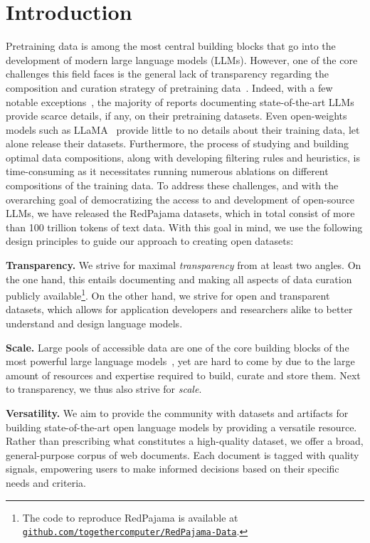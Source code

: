 \documentclass{article}
\begin{document}
\section{Introduction}
Pretraining data is among the most central building blocks that go into the development of modern large language models (LLMs).
However, one of the core challenges this field faces is the general lack of transparency regarding the composition and curation strategy of pretraining data~\cite{bommasani2023foundation}. Indeed, with a few notable exceptions~\cite{groeneveld2024olmo,biderman2023pythia,almazrouei2023falcon,zhang2024map}, the majority of reports documenting state-of-the-art LLMs~\cite{achiam2023gpt} provide scarce details, if any, on their pretraining datasets. 
Even open-weights models such as LLaMA~\cite{touvron2023allama,touvron2023bllama} provide little to no details about their training data, let alone release their datasets. 
Furthermore, the process of studying and building optimal data compositions, along with developing filtering rules and heuristics, is time-consuming as it necessitates running numerous ablations on different compositions of the training data.
To address these challenges, and with the overarching goal of democratizing the access to and development of open-source LLMs, we have released the RedPajama datasets, which in total consist of more than 100 trillion tokens of text data. With this goal in mind, we use the following design principles to guide our approach to creating open datasets:

{\bf Transparency.} We strive for maximal {\it transparency} from at least two angles. On the one hand, this entails documenting and making all aspects of data curation publicly available\footnote{The code to reproduce RedPajama is available at \href{https://github.com/togethercomputer/RedPajama-Data}{\texttt{github.com/togethercomputer/RedPajama-Data}}.}. On the other hand, we strive for open and transparent datasets, which allows for application developers and researchers alike to better understand and design language models.

{\bf Scale.} Large pools of accessible data are one of the core building blocks of the most powerful large language models~\cite{soldaini2024dolma,brown2020language,touvron2023bllama,achiam2023gpt}, yet are hard to come by due to the large amount of resources and expertise required to build, curate and store them. Next to transparency, we thus also strive for {\it scale}.

{\bf Versatility.} We aim to provide the community with datasets and artifacts for building state-of-the-art open language models by providing a versatile resource. Rather than prescribing what constitutes a high-quality dataset, we offer a broad, general-purpose corpus of web documents. Each document is tagged with quality signals, empowering users to make informed decisions based on their specific needs and criteria.
\end{document}
